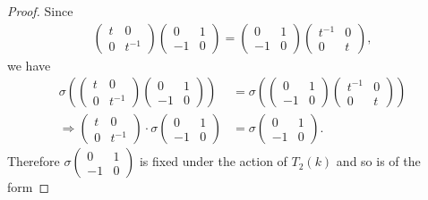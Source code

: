 \begin{proof}
Since
\begin{align*}
		\left(\begin{matrix}t & 0\\0 & t^{-1}\end{matrix}\right)
		\left(\begin{matrix}0 & 1\\-1 & 0\end{matrix}\right) =
		\left(\begin{matrix}0 & 1\\-1 & 0\end{matrix}\right)
		\left(\begin{matrix}t^{-1} & 0\\0 & t\end{matrix}\right),
\end{align*}
we have
\begin{align*}
	\sigma\left(
		\left(\begin{matrix}t & 0\\0 & t^{-1}\end{matrix}\right)
		\left(\begin{matrix}0 & 1\\-1 & 0\end{matrix}\right)
	\right) &= 
	\sigma\left(
		\left(\begin{matrix}0 & 1\\-1 & 0\end{matrix}\right)
		\left(\begin{matrix}t^{-1} & 0\\0 & t\end{matrix}\right)
	\right) \\
	\Rightarrow
		\left(\begin{matrix}t & 0\\0 & t^{-1}\end{matrix}\right)\cdot
		\sigma\left(\begin{matrix}0 & 1\\-1 & 0\end{matrix}\right)
	 &= 
	\sigma
		\left(\begin{matrix}0 & 1\\-1 & 0\end{matrix}\right).
\end{align*}
Therefore $\sigma\left(\begin{matrix}0 & 1\\ -1 & 0\end{matrix}\right)$ is fixed under the action of $T_2(k)$ and so is of the form

\end{proof}
